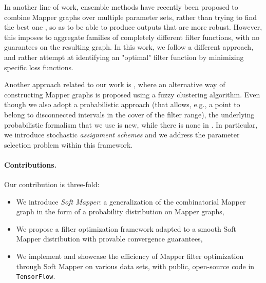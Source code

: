 In another line of work, ensemble methods have recently been proposed to combine Mapper graphs over multiple parameter sets, rather than trying to find the best one \cite{kang2021ensemble,fitzpatrick2023ensemble},
so as to be able to produce outputs that are more robust. However, this imposes to aggregate families of completely different filter functions, with no guarantees on the resulting graph. %
In this work, we follow a different approach, and rather attempt at identifying an "optimal" filter function by minimizing specific loss functions.


Another approach related to our work is \cite{bui2020f}, where an alternative way of constructing Mapper graphs is proposed using a fuzzy clustering algorithm. %
Even though we also adopt a probabilistic approach (that allows, e.g., a point to belong to disconnected intervals in the cover of the filter range), the underlying probabilistic formalism 
that we use is new, while there is none in \cite{bui2020f}. In particular, we introduce stochastic {\it assignment schemes} and we address the parameter selection problem within this framework. 




 



\paragraph*{Contributions.} Our contribution is three-fold:
\begin{itemize}
    \item We introduce {\em Soft Mapper}: a generalization of the combinatorial Mapper graph in the form of a probability distribution on Mapper graphs,
    \item We propose a filter optimization framework adapted to a smooth Soft Mapper distribution with provable convergence guarantees,
    \item We implement and showcase the efficiency of Mapper filter optimization through Soft Mapper on various data sets, with public, open-source code in \texttt{TensorFlow}. 
\end{itemize}

